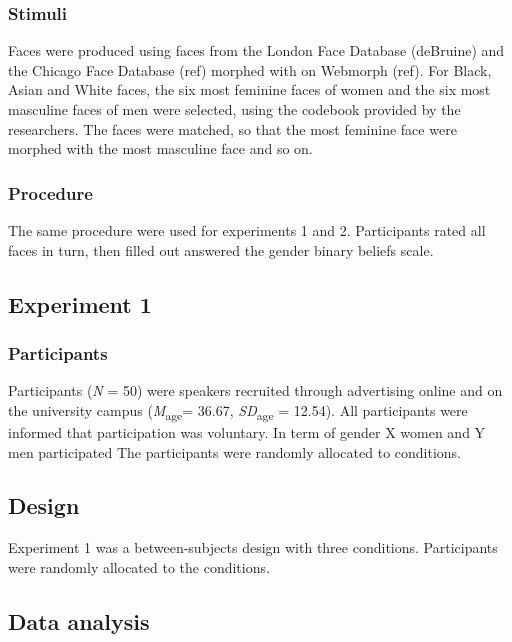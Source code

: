 \documentclass[
  man]{apa7}
\begin{document}
\hypertarget{stimuli}{%
\subsubsection{Stimuli}\label{stimuli}}

Faces were produced using faces from the London Face Database (deBruine) and the Chicago Face Database (ref) morphed with on Webmorph (ref). For Black, Asian and White faces, the six most feminine faces of women and the six most masculine faces of men were selected, using the codebook provided by the researchers. The faces were matched, so that the most feminine face were morphed with the most masculine face and so on.

\hypertarget{procedure}{%
\subsubsection{Procedure}\label{procedure}}

The same procedure were used for experiments 1 and 2. Participants rated all faces in turn, then filled out answered the gender binary beliefs scale.

\hypertarget{experiment-1}{%
\subsection{Experiment 1}\label{experiment-1}}

\hypertarget{participants}{%
\subsubsection{Participants}\label{participants}}

Participants (\emph{N} = 50) were speakers recruited through advertising online and on the university campus (\emph{M}\textsubscript{age}= 36.67, \emph{SD}\textsubscript{age} = 12.54). All participants were informed that participation was voluntary. In term of gender X women and Y men participated The participants were randomly allocated to conditions.

\hypertarget{design}{%
\subsection{Design}\label{design}}

Experiment 1 was a between-subjects design with three conditions. Participants were randomly allocated to the conditions.

\hypertarget{data-analysis}{%
\subsection{Data analysis}\label{data-analysis}}
\end{document}
